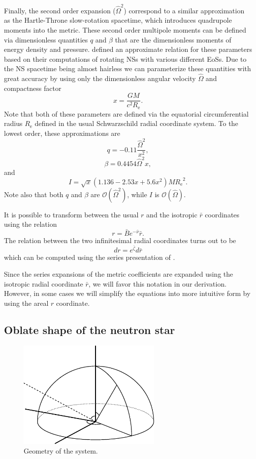 \documentclass[iop, usenatbib]{emulateapj}
\newcommand{\be}{\begin{equation}}
\newcommand{\ee}{\end{equation}}
\newcommand{\Req}{\ensuremath{R_{\mathrm{e}}}}
\newcommand{\sch}{Schwarzschild }
\newcommand{\rb}{\ensuremath{\bar{r}}}
\newcommand{\Ob}{\ensuremath{\hat{\Omega}}}
\newcommand{\nub}{\ensuremath{\bar{\nu}}}
\newcommand{\zetab}{\ensuremath{\bar{\zeta}}}
\newcommand{\Bb}{\ensuremath{\bar{B}}}
\begin{document}
Finally, the second order expansion ($\Ob^2$) correspond to a similar approximation as the Hartle-Throne slow-rotation spacetime, which introduces quadrupole moments into the metric.  
These second order multipole moments can be defined via dimensionless quantities $q$ and $\beta$ that are the dimensionless moments of energy density and pressure.  
\citet{aGM14} defined an approximate relation for these parameters based on their computations of rotating NSs with various different EoSs.  
Due to the NS spacetime being almost hairless we can parameterize these quantities with great accuracy by using only the dimensionless angular velocity $\Ob$ and compactness factor
\be
x = \frac{G M}{c^2 \Req}.
\ee
Note that both of these parameters are defined via the equatorial circumferential radius $\Req$ defined in the usual \sch radial coordinate system.
To the lowest order, these approximations are
\be
q = -0.11 \frac{\Ob^2}{x^2},
\ee
\be
\beta = 0.4454 \Ob^2 x,
\ee
and
\be
I = \sqrt{x} (1.136 - 2.53 x + 5.6 x^2) M \Req^2.
\ee
Note also that both $q$ and $\beta$ are $\mathcal{O}(\Ob^2)$, while $I$ is $\mathcal{O}(\Ob)$.
    
It is possible to transform between the usual $r$ and the isotropic $\rb$ coordinates using the relation \citep{FIP86}
\be\label{eq:rb2r}
r = \Bb e^{-\nub} \rb.
\ee
The relation between the two infinitesimal radial coordinates turns out to be
\be\label{eq:drb2dr}
dr = e^{\zetab} d\rb
\ee
which can be computed using the series presentation of \cite{BI76}.

Since the series expansions of the metric coefficients are expanded using the isotropic radial coordinate $\rb$, we will favor this notation in our derivation.  
However, in some cases we will simplify the equations into more intuitive form by using the areal $r$ coordinate.


\subsection{Oblate shape of the neutron star}

\begin{figure}
\centering
\includegraphics[width=7cm]{figs/fig1.eps}
\caption{\label{fig:geom}
  Geometry of the system.
}
\end{figure}
\end{document}
